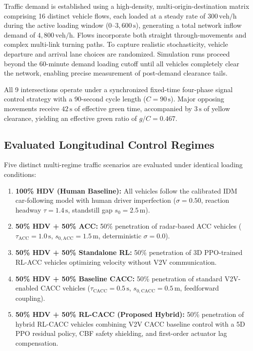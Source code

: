 \documentclass[11pt,a4paper]{article}
\begin{document}
Traffic demand is established using a high-density, multi-origin-destination matrix comprising 16 distinct vehicle flows, each loaded at a steady rate of $300\,\text{veh/h}$ during the active loading window ($0\text{--}3{,}600\,\mathrm{s}$), generating a total network inflow demand of $4{,}800\,\text{veh/h}$. Flows incorporate both straight through-movements and complex multi-link turning paths. To capture realistic stochasticity, vehicle departure and arrival lane choices are randomized. Simulation runs proceed beyond the 60-minute demand loading cutoff until all vehicles completely clear the network, enabling precise measurement of post-demand clearance tails.

All 9 intersections operate under a synchronized fixed-time four-phase signal control strategy with a 90-second cycle length ($C = 90\,\mathrm{s}$). Major opposing movements receive $42\,\mathrm{s}$ of effective green time, accompanied by $3\,\mathrm{s}$ of yellow clearance, yielding an effective green ratio of $g/C = 0.467$.

\subsection{Evaluated Longitudinal Control Regimes}
Five distinct multi-regime traffic scenarios are evaluated under identical loading conditions:
\begin{enumerate}
    \item \textbf{100\% HDV (Human Baseline):} All vehicles follow the calibrated IDM car-following model with human driver imperfection ($\sigma = 0.50$, reaction headway $\tau = 1.4\,\mathrm{s}$, standstill gap $s_0 = 2.5\,\mathrm{m}$).
    \item \textbf{50\% HDV + 50\% ACC:} 50\% penetration of radar-based ACC vehicles ($\tau_{\text{ACC}} = 1.0\,\mathrm{s}$, $s_{0,\text{ACC}} = 1.5\,\mathrm{m}$, deterministic $\sigma = 0.0$).
    \item \textbf{50\% HDV + 50\% Standalone RL:} 50\% penetration of 3D PPO-trained RL-ACC vehicles optimizing velocity without V2V communication.
    \item \textbf{50\% HDV + 50\% Baseline CACC:} 50\% penetration of standard V2V-enabled CACC vehicles ($\tau_{\text{CACC}} = 0.5\,\mathrm{s}$, $s_{0,\text{CACC}} = 0.5\,\mathrm{m}$, feedforward coupling).
    \item \textbf{50\% HDV + 50\% RL-CACC (Proposed Hybrid):} 50\% penetration of hybrid RL-CACC vehicles combining V2V CACC baseline control with a 5D PPO residual policy, CBF safety shielding, and first-order actuator lag compensation.
\end{enumerate}
\end{document}
